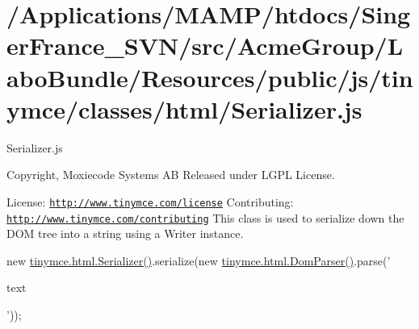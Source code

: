 \hypertarget{_2_applications_2_m_a_m_p_2htdocs_2_singer_france__s_v_n_2src_2_acme_group_2_labo_bundle_2_resou83f45805ddb9849b2f74b3f014a096de}{\section{/\+Applications/\+M\+A\+M\+P/htdocs/\+Singer\+France\+\_\+\+S\+V\+N/src/\+Acme\+Group/\+Labo\+Bundle/\+Resources/public/js/tinymce/classes/html/\+Serializer.\+js}
}
Serializer.\+js

Copyright, Moxiecode Systems A\+B Released under L\+G\+P\+L License.

License\+: \href{http://www.tinymce.com/license}{\tt http\+://www.\+tinymce.\+com/license} Contributing\+: \href{http://www.tinymce.com/contributing}{\tt http\+://www.\+tinymce.\+com/contributing} This class is used to serialize down the D\+O\+M tree into a string using a Writer instance.

new \hyperlink{classtinymce_1_1html_1_1_serializer}{tinymce.\+html.\+Serializer()}.serialize(new \hyperlink{classtinymce_1_1html_1_1_dom_parser}{tinymce.\+html.\+Dom\+Parser()}.parse('

text

'));


\begin{DoxyCodeInclude}
\end{DoxyCodeInclude}
 